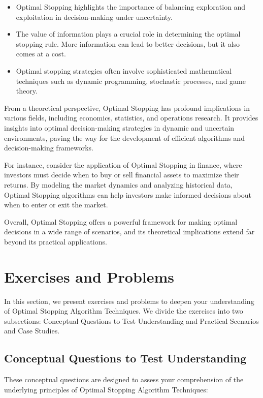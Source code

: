 \documentclass[12pt]{book} %
\begin{document}
\begin{itemize}
    \item Optimal Stopping highlights the importance of balancing exploration and exploitation in decision-making under uncertainty.
    \item The value of information plays a crucial role in determining the optimal stopping rule. More information can lead to better decisions, but it also comes at a cost.
    \item Optimal stopping strategies often involve sophisticated mathematical techniques such as dynamic programming, stochastic processes, and game theory.
\end{itemize}

From a theoretical perspective, Optimal Stopping has profound implications in various fields, including economics, statistics, and operations research. It provides insights into optimal decision-making strategies in dynamic and uncertain environments, paving the way for the development of efficient algorithms and decision-making frameworks.

For instance, consider the application of Optimal Stopping in finance, where investors must decide when to buy or sell financial assets to maximize their returns. By modeling the market dynamics and analyzing historical data, Optimal Stopping algorithms can help investors make informed decisions about when to enter or exit the market.

Overall, Optimal Stopping offers a powerful framework for making optimal decisions in a wide range of scenarios, and its theoretical implications extend far beyond its practical applications.


\section{Exercises and Problems}
In this section, we present exercises and problems to deepen your understanding of Optimal Stopping Algorithm Techniques. We divide the exercises into two subsections: Conceptual Questions to Test Understanding and Practical Scenarios and Case Studies.

\subsection{Conceptual Questions to Test Understanding}
These conceptual questions are designed to assess your comprehension of the underlying principles of Optimal Stopping Algorithm Techniques:
\end{document}
